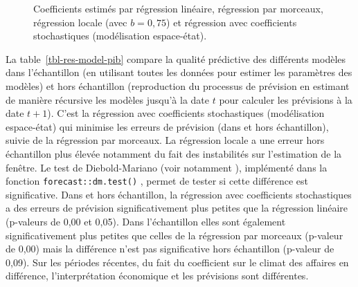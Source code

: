 \documentclass[
  a4paper,
  DIV=11,
  numbers=noendperiod,
  french]{scrartcl}
\newcommand\1{{\mathds 1}}
\theoremstyle{remark}
\begin{document}
\begin{figure}

\caption{\label{fig-coef-ssm}Coefficients estimés par régression
linéaire, régression par morceaux, régression locale (avec \(b=0,75\))
et régression avec coefficients stochastiques (modélisation
espace-état).}


\end{figure}%

La table~\ref{tbl-res-model-pib} compare la qualité prédictive des
différents modèles dans l'échantillon (en utilisant toutes les données
pour estimer les paramètres des modèles) et hors échantillon
(reproduction du processus de prévision en estimant de manière récursive
les modèles jusqu'à la date \(t\) pour calculer les prévisions à la date
\(t+1\)). C'est la régression avec coefficients stochastiques
(modélisation espace-état) qui minimise les erreurs de prévision (dans
et hors échantillon), suivie de la régression par morceaux. La
régression locale a une erreur hors échantillon plus élevée notamment du
fait des instabilités sur l'estimation de la fenêtre. Le test de
Diebold-Mariano (voir notamment \textcite{DMtest}), implémenté dans la
fonction \texttt{forecast::dm.test()} \autocite{forecastR}, permet de
tester si cette différence est significative. Dans et hors échantillon,
la régression avec coefficients stochastiques a des erreurs de prévision
significativement plus petites que la régression linéaire (p-valeurs de
0,00 et 0,05). Dans l'échantillon elles sont également significativement
plus petites que celles de la régression par morceaux (p-valeur de 0,00)
mais la différence n'est pas significative hors échantillon (p-valeur de
0,09). Sur les périodes récentes, du fait du coefficient sur le climat
des affaires en différence, l'interprétation économique et les
prévisions sont différentes.
\end{document}
